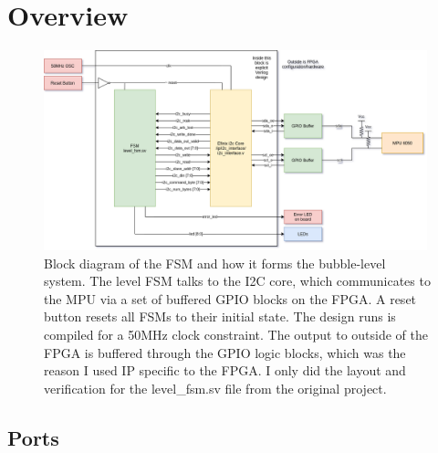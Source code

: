 \documentclass[11pt]{article}
\begin{document}
\section{Overview}
\begin{figure}[H]
    \centering
\includegraphics[width=0.99\textwidth]{fsm.png}
    \caption{Block diagram of the FSM and how it forms the bubble-level system. The level FSM talks to the I2C core, which communicates to the MPU via a set of buffered GPIO blocks on the FPGA. A reset button resets all FSMs to their initial state. The design runs is compiled for a 50MHz clock constraint. The output to outside of the FPGA is buffered through the GPIO logic blocks, which was the reason I used IP specific to the FPGA. I only did the layout and verification for the level\_fsm.sv file from the original project.}
\end{figure}


\subsection{Ports}
\end{document}
